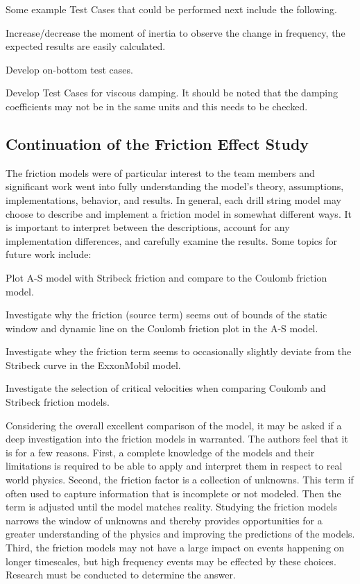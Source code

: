 Some example Test Cases that could be performed next include the following.
\begin{bulletedlist}
	\item Increase/decrease the moment of inertia to observe the change in frequency, the expected results are easily calculated.
	\item Develop on-bottom test cases.
    \item Develop Test Cases for viscous damping.  It should be noted that the damping coefficients may not be in the same units and this needs to be checked.
\end{bulletedlist}

\subsection{Continuation of the Friction Effect Study}
The friction models were of particular interest to the team members and significant work went into fully understanding the model's theory, assumptions, implementations, behavior, and results.  In general, each drill string model may choose to describe and implement a friction model in somewhat different ways.  It is important to interpret between the descriptions, account for any implementation differences, and carefully examine the results.  Some topics for future work include:
\begin{bulletedlist}
	\item Plot A-S model with Stribeck friction and compare to the Coulomb friction model.
	\item Investigate why the friction (source term) seems out of bounds of the static window and dynamic line on the Coulomb friction plot in the A-S model.
	\item Investigate whey the friction term seems to occasionally slightly deviate from the Stribeck curve in the ExxonMobil model.
	\item Investigate the selection of critical velocities when comparing Coulomb and Stribeck friction models.
\end{bulletedlist}

Considering the overall excellent comparison of the model, it may be asked if a deep investigation into the friction models in warranted. The authors feel that it is for a few reasons.  First, a complete knowledge of the models and their limitations is required to be able to apply and interpret them in respect to real world physics.  Second, the friction factor is a collection of unknowns.  This term if often used to capture information that is incomplete or not modeled.  Then the term is adjusted until the model matches reality.  Studying the friction models narrows the window of unknowns and thereby provides opportunities for a greater understanding of the physics and improving the predictions of the models.  Third, the friction models may not have a large impact on events happening on longer timescales, but high frequency events may be effected by these choices.  Research must be conducted to determine the answer.

